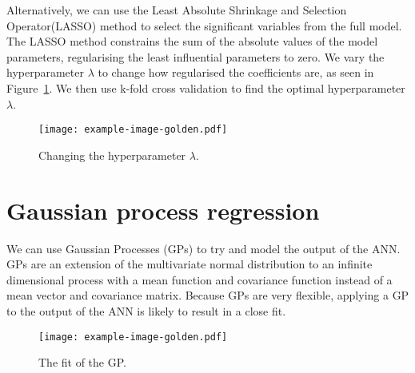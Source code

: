 Alternatively, we can use the Least Absolute Shrinkage and Selection Operator(LASSO) method to select the significant variables from the full model.
The LASSO method constrains the sum of the absolute values of the model parameters, regularising the least influential parameters to zero.
We vary the hyperparameter \(\lambda\) to change how regularised the coefficients are, as seen in Figure~\ref{fig:lasso-lambda}.
We then use k-fold cross validation to find the optimal hyperparameter \(\lambda\).

\begin{figure}[htbp]
	\centering
	\texttt{[image: example-image-golden.pdf]}
	\caption{Changing the hyperparameter \(\lambda\).}
	\label{fig:lasso-lambda}
\end{figure}


\section{Gaussian process regression}

We can use Gaussian Processes (GPs) to try and model the output of the ANN.
GPs are an extension of the multivariate normal distribution to an infinite dimensional process with a mean function and covariance function instead of a mean vector and covariance matrix.
Because GPs are very flexible, applying a GP to the output of the ANN is likely to result in a close fit.

\begin{figure}[htbp]
	\centering
	\texttt{[image: example-image-golden.pdf]}
	\caption{The fit of the GP.}
	\label{fig:gp-fit}
\end{figure}
